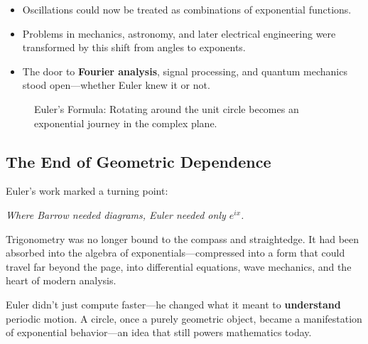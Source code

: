 \begin{itemize}
    \item Oscillations could now be treated as combinations of exponential functions.
    \item Problems in mechanics, astronomy, and later electrical engineering were transformed by this shift from angles to exponents.
    \item The door to \textbf{Fourier analysis}, signal processing, and quantum mechanics stood open—whether Euler knew it or not.
\end{itemize}

\begin{figure}[H]
    \centering
    \caption{Euler’s Formula: Rotating around the unit circle becomes an exponential journey in the complex plane.}
\end{figure}

\subsection{The End of Geometric Dependence}

Euler’s work marked a turning point:

\begin{center}
\textit{Where Barrow needed diagrams, Euler needed only \( e^{ix} \).}
\end{center}

Trigonometry was no longer bound to the compass and straightedge. It had been absorbed into the algebra of exponentials—compressed into a form that could travel far beyond the page, into differential equations, wave mechanics, and the heart of modern analysis.

\vspace{1em}

Euler didn’t just compute faster—he changed what it meant to \textbf{understand} periodic motion.  
A circle, once a purely geometric object, became a manifestation of exponential behavior—an idea that still powers mathematics today.
